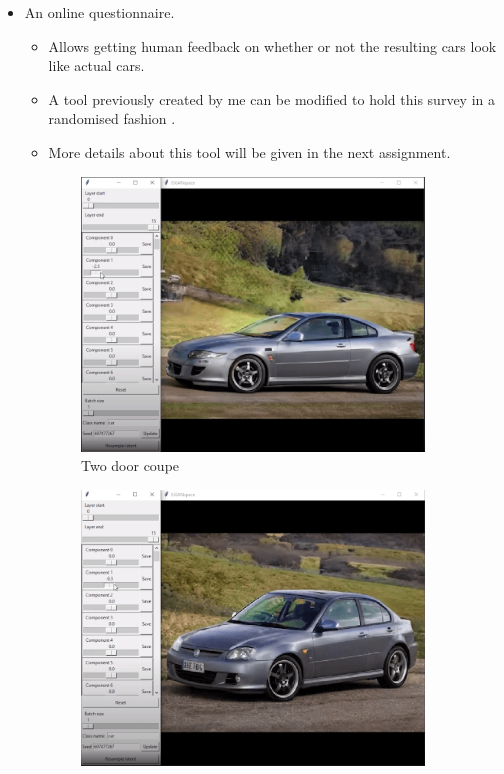 \begin{itemize}
\begin{itemize}
    \end{itemize}
    \item An online questionnaire.
    \begin{itemize}
        \item Allows getting human feedback on whether or not the resulting cars look like actual cars.
        \item A tool previously created by me can be modified to hold this survey in a randomised fashion \citep{bapproef}.
        \item More details about this tool will be given in the next assignment.
    \end{itemize}
\end{itemize}

\begin{figure}
\centering
\begin{subfigure}{.45\textwidth}
  \centering
  \includegraphics[width=\textwidth]{images/ganspace_1.png}
  \caption{Two door coupe}
  \label{fig:twodoor}
\end{subfigure}%
\hspace{1cm}
\begin{subfigure}{.45\textwidth}
  \centering
  \includegraphics[width=\textwidth]{images/ganspace_2.png}

\end{subfigure}
\end{figure}
